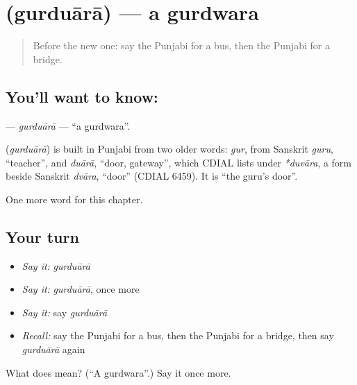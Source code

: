 \section[\texorpdfstring{\pa{ਗੁਰਦੁਆਰਾ} (gurduārā)}{ਗੁਰਦੁਆਰਾ (gurduārā)}]{ (gurduārā) — a gurdwara}

\label{lesson:PA-C91-gurduara}



\begin{quote}
Before the new one: say the Punjabi for a bus, then the Punjabi for a bridge.
\end{quote}

\subsection*{You'll want to know: }
\textbf{} — \emph{gurduārā} — \textquotedblleft{}a gurdwara\textquotedblright{}.

\begin{cousinweb}
\textbf{} (\emph{gurduārā}) is built in Punjabi from two older words: \emph{gur}, from Sanskrit \emph{guru}, \textquotedblleft{}teacher\textquotedblright{}, and \emph{duārā}, \textquotedblleft{}door, gateway\textquotedblright{}, which CDIAL lists under \emph{*duvāra}, a form beside Sanskrit \emph{dvāra}, \textquotedblleft{}door\textquotedblright{} (CDIAL 6459). It is \textquotedblleft{}the guru's door\textquotedblright{}.
\end{cousinweb}

\begin{grammarlens}[title={What you've built}]
One more word for this chapter.
\end{grammarlens}

\subsection*{Your turn}
\begin{itemize}
\raggedright
  \item \emph{Say it:} \emph{gurduārā}
  \item \emph{Say it:} \emph{gurduārā}, once more
  \item \emph{Say it:} say \emph{gurduārā}
  \item \emph{Recall:} say the Punjabi for a bus, then the Punjabi for a bridge, then say \emph{gurduārā} again
\end{itemize}

\begin{tcolorbox}[breakable,colback=teal!4,colframe=teal!35!black,title={Before you move on}]
What does  mean? (\textquotedblleft{}A gurdwara\textquotedblright{}.) Say it once more.
\end{tcolorbox}
